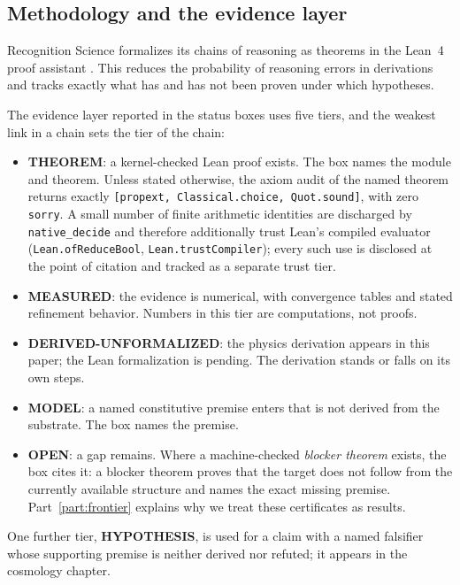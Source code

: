 \documentclass[11pt,letterpaper]{article}
\newcommand{\lean}[1]{\texttt{#1}}
\begin{document}
\subsection{Methodology and the evidence layer}
\label{sec:method}

Recognition Science formalizes its chains of reasoning as theorems in the Lean~4 proof assistant \cite{Lean4}. This reduces the probability of reasoning errors in derivations and tracks exactly what has and has not been proven under which hypotheses.

The evidence layer reported in the status boxes uses five tiers, and the weakest link in a chain sets the tier of the chain:
\begin{itemize}
\item \textbf{THEOREM}: a kernel-checked Lean proof exists. The box names the module and theorem. Unless stated otherwise, the axiom audit of the named theorem returns exactly \lean{[propext, Classical.choice, Quot.sound]}, with zero \lean{sorry}. A small number of finite arithmetic identities are discharged by \lean{native\_decide} and therefore additionally trust Lean's compiled evaluator (\lean{Lean.ofReduceBool}, \lean{Lean.trustCompiler}); every such use is disclosed at the point of citation and tracked as a separate trust tier.
\item \textbf{MEASURED}: the evidence is numerical, with convergence tables and stated refinement behavior. Numbers in this tier are computations, not proofs.
\item \textbf{DERIVED-UNFORMALIZED}: the physics derivation appears in this paper; the Lean formalization is pending. The derivation stands or falls on its own steps.
\item \textbf{MODEL}: a named constitutive premise enters that is not derived from the substrate. The box names the premise.
\item \textbf{OPEN}: a gap remains. Where a machine-checked \emph{blocker theorem} exists, the box cites it: a blocker theorem proves that the target does not follow from the currently available structure and names the exact missing premise. Part~\ref{part:frontier} explains why we treat these certificates as results.
\end{itemize}
One further tier, \textbf{HYPOTHESIS}, is used for a claim with a named falsifier whose supporting premise is neither derived nor refuted; it appears in the cosmology chapter.
\end{document}
